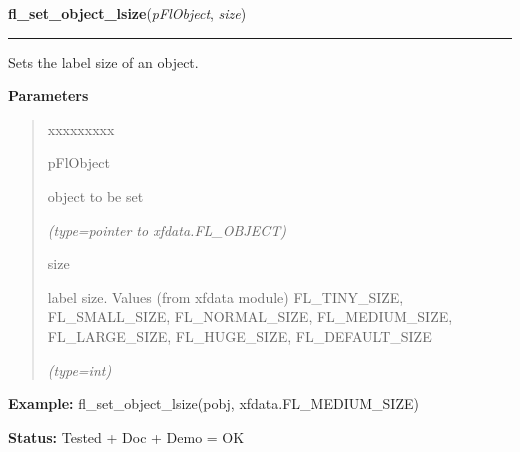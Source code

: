     \label{xformslib:flbasic:fl_set_object_lsize}

    \vspace{0.5ex}

\hspace{.8\funcindent}\begin{boxedminipage}{\funcwidth}

    \raggedright \textbf{fl\_set\_object\_lsize}(\textit{pFlObject}, \textit{size})

    \vspace{-1.5ex}

    \rule{\textwidth}{0.5\fboxrule}
\setlength{\parskip}{2ex}
    Sets the label size of an object.

\setlength{\parskip}{1ex}
      \textbf{Parameters}
      \vspace{-1ex}

      \begin{quote}
        \begin{Ventry}{xxxxxxxxx}

          \item[pFlObject]

          object to be set

            {\it (type=pointer to xfdata.FL\_OBJECT)}

          \item[size]

          label size. Values (from xfdata module) FL\_TINY\_SIZE, 
          FL\_SMALL\_SIZE, FL\_NORMAL\_SIZE, FL\_MEDIUM\_SIZE, 
          FL\_LARGE\_SIZE, FL\_HUGE\_SIZE, FL\_DEFAULT\_SIZE

            {\it (type=int)}

        \end{Ventry}

      \end{quote}

\textbf{Example:} fl\_set\_object\_lsize(pobj, xfdata.FL\_MEDIUM\_SIZE)



\textbf{Status:} Tested + Doc + Demo = OK



    \end{boxedminipage}

    \label{xformslib:flbasic:fl_get_object_lsize}


